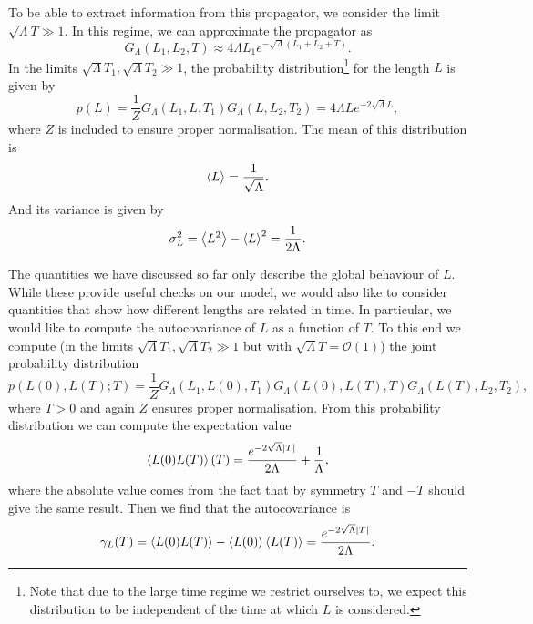 To be able to extract information from this propagator, we consider the limit $\sqrt{\Lambda} T \gg 1$. In this regime, we can approximate the propagator as
\begin{equation}
    G_\Lambda(L_1, L_2, T)
    \approx
    4 \Lambda L_1 e^{-\sqrt{\Lambda} (L_1 + L_2 + T)}
    .
\end{equation}
In the limits $\sqrt{\Lambda} T_1, \sqrt{\Lambda} T_2 \gg 1$, the probability distribution\footnote{Note that due to the large time regime we restrict ourselves to, we expect this distribution to be independent of the time at which $L$ is considered.} for the length $L$ is given by
\begin{equation}
    p(L)
    =
    \frac{1}{Z}
    G_\Lambda(L_1, L, T_1)
    G_\Lambda(L, L_2, T_2)
    =
    4 \Lambda L e^{-2 \sqrt{\Lambda} L}
    ,
\end{equation}
where $Z$ is included to ensure proper normalisation. The mean of this distribution is
\begin{equation}\label{eq:exp_ell}
    \ev{L} = \frac{1}{\sqrt{\Lambda}}.
\end{equation}
And its variance is given by
\begin{equation}\label{eq:std_ell}
    \sigma_L^2 = \ev{L^2} - \ev{L}^2 = \frac{1}{2 \Lambda}
    .
\end{equation}

The quantities we have discussed so far only describe the global behaviour of $L$. While these provide useful checks on our model, we would also like to consider quantities that show how different lengths are related in time. In particular, we would like to compute the autocovariance of $L$ as a function of $T$. To this end we compute (in the limits $\sqrt{\Lambda} T_1, \sqrt{\Lambda} T_2 \gg 1$ but with $\sqrt{\Lambda} T = \mathcal{O}(1)$) the joint probability distribution
\begin{equation}
    p(L(0), L(T); T)
    =
    \frac{1}{Z}
    G_\Lambda(L_1, L(0), T_1)
    G_\Lambda(L(0), L(T), T)
    G_\Lambda(L(T), L_2, T_2),
\end{equation}
where $T > 0$ and again $Z$ ensures proper normalisation. From this probability distribution we can compute the expectation value
\begin{equation}
    \ev{L(0) L(T)}(T)
    =
    \frac{e^{-2 \sqrt{\Lambda} \abs{T}}}{2 \Lambda} + \frac{1}{\Lambda}
    ,
\end{equation}
where the absolute value comes from the fact that by symmetry $T$ and $-T$ should give the same result. Then we find that the autocovariance is
\begin{equation}\label{eq:cov_ell}
    \gamma_L(T)
    =
    \ev{L(0) L(T)} - \ev{L(0)} \ev{L(T)}
    =
    \frac{e^{-2 \sqrt{\Lambda} \abs{T}}}{2 \Lambda}
    .
\end{equation}

